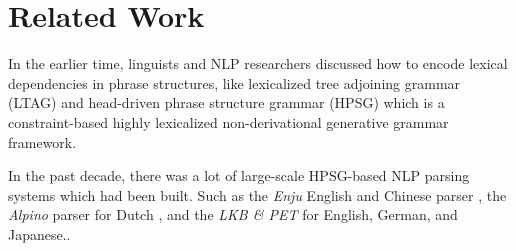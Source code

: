 \documentclass[11pt,a4paper]{article}
\begin{document}
\begin{table}[t!]
    \centering
{}
    \caption{\label{table6} Constituent parsing on CTB test set. * represents CTB dependency data splitting.}
\end{table}

\section{Related Work}

In the earlier time, linguists and NLP researchers discussed how to encode lexical dependencies in phrase structures, like lexicalized tree adjoining grammar (LTAG) \cite{SCHABESC88-2121}
and head-driven phrase structure grammar (HPSG) \cite{pollard1994head} which is a constraint-based highly lexicalized non-derivational generative grammar framework. 


In the past decade, 
there was a lot of large-scale HPSG-based NLP parsing systems which had been built. Such as the \textit{Enju} English and Chinese parser \cite{Miyao2004CorpusOrientedGD, YuC10-2162}, the \textit{Alpino} parser for Dutch \cite{van2006last}, and the \textit{LKB \& PET} \cite{copestake2002implementing, Callmeier2000PET} for English, German, and Japanese..
\end{document}
